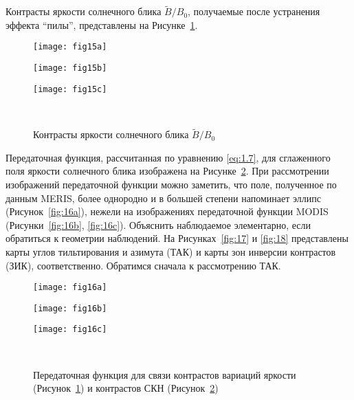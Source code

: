 Контрасты яркости солнечного блика $\tilde{B}/B_{0}$, получаемые после устранения эффекта ``пилы'', представлены на Рисунке~\ref{fig:15}.



\begin{figure}[H]
    	\centering
	\begin{minipage}{.31\textwidth}
	    \subcaptionbox{\label{fig:15a}}
		{\texttt{[image: fig15a]}}
	\end{minipage}
	\hfill
	\begin{minipage}{.31\textwidth}
	    \subcaptionbox{\label{fig:15b}}
		{\texttt{[image: fig15b]}}
	\end{minipage}
	\hfill
	\begin{minipage}{.31\textwidth}
	    \subcaptionbox{\label{fig:15c}}
		{\texttt{[image: fig15c]}}
	\end{minipage}
	\\
    \caption{Контрасты яркости солнечного блика $\tilde{B}/B_{0}$}
    \label{fig:15}
\end{figure}



Передаточная функция, рассчитанная по уравнению \eqref{eq:1.7}, для сглаженного поля яркости солнечного блика изображена на Рисунке~\ref{fig:16}. При рассмотрении изображений передаточной функции можно заметить, что поле, полученное по данным MERIS, более однородно и в большей степени напоминает эллипс (Рисунок~\ref{fig:16a}), нежели на изображениях передаточной функции MODIS (Рисунки~\ref{fig:16b}, \ref{fig:16c}). Объяснить наблюдаемое элементарно, если обратиться к геометрии наблюдений. На Рисунках~\ref{fig:17} и \ref{fig:18} представлены карты углов тильтирования и азимута (ТАК) и карты зон инверсии контрастов (ЗИК), соответственно. Обратимся сначала к рассмотрению ТАК.


\begin{figure}[H]
    	\centering
	\begin{minipage}{.33\textwidth}
	    \subcaptionbox{\label{fig:16a}}
		{\texttt{[image: fig16a]}}
	\end{minipage}
	\hfill
	\begin{minipage}{.31\textwidth}
	    \subcaptionbox{\label{fig:16b}}
		{\texttt{[image: fig16b]}}
	\end{minipage}
	\hfill
	\begin{minipage}{.31\textwidth}
	    \subcaptionbox{\label{fig:16c}}
		{\texttt{[image: fig16c]}}
	\end{minipage}
	\\
    \caption{Передаточная функция  для связи контрастов вариаций яркости (Рисунок~\ref{fig:15}) и контрастов СКН (Рисунок~\ref{fig:16})}
    \label{fig:16}
\end{figure}




